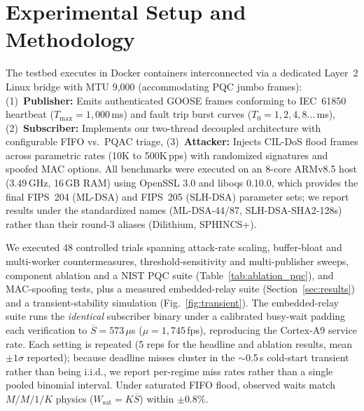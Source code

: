 \documentclass[journal]{IEEEtran}
\begin{document}
\section{Experimental Setup and Methodology}
\label{sec:experiments}

The testbed executes in Docker containers interconnected via a dedicated Layer~2 Linux bridge with MTU 9,000 (accommodating PQC jumbo frames):
(1)~\textbf{Publisher:} Emits authenticated GOOSE frames conforming to IEC~61850 heartbeat ($T_{\max} = 1{,}000$\,ms) and fault trip burst curves ($T_0 = 1, 2, 4, 8\dots$\,ms),
(2)~\textbf{Subscriber:} Implements our two-thread decoupled architecture with configurable FIFO vs.\ PQAC triage,
(3)~\textbf{Attacker:} Injects CIL-DoS flood frames across parametric rates (10K to 500K\,pps) with randomized signatures and spoofed MAC options.
All benchmarks were executed on an 8-core ARMv8.5 host (3.49\,GHz, 16\,GB RAM) using OpenSSL 3.0 and liboqs 0.10.0, which provides the final FIPS~204 (ML-DSA) and FIPS~205 (SLH-DSA) parameter sets; we report results under the standardized names (ML-DSA-44/87, SLH-DSA-SHA2-128s) rather than their round-3 aliases (Dilithium, SPHINCS+).

We executed 48 controlled trials spanning attack-rate scaling, buffer-bloat and multi-worker countermeasures, threshold-sensitivity and multi-publisher sweeps, component ablation and a NIST PQC suite (Table~\ref{tab:ablation_pqc}), and MAC-spoofing tests, plus a measured embedded-relay suite (Section~\ref{sec:results}) and a transient-stability simulation (Fig.~\ref{fig:transient}). The embedded-relay suite runs the \emph{identical} subscriber binary under a calibrated busy-wait padding each verification to $\overline{S}=573\,\mu$s ($\mu=1{,}745$\,fps), reproducing the Cortex-A9 service rate. Each setting is repeated (5 reps for the headline and ablation results, mean $\pm 1\sigma$ reported); because deadline misses cluster in the $\sim$0.5\,s cold-start transient rather than being i.i.d., we report per-regime miss rates rather than a single pooled binomial interval. Under saturated FIFO flood, observed waits match $M/M/1/K$ physics ($W_{\text{sat}}=K\overline{S}$) within $\pm 0.8\%$.

\end{document}
